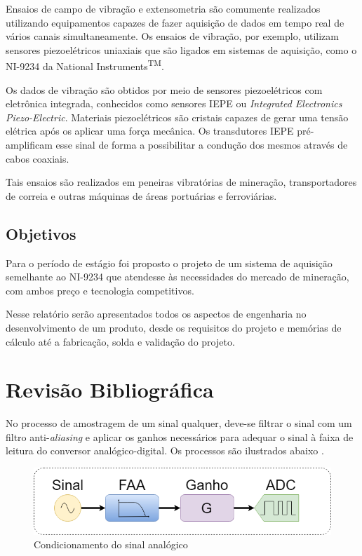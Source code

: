 \documentclass[
	12pt,				%
	openright,			%
	twoside,			%
	a4paper,			%
	english,			%
	french,				%
	spanish,			%
	brazil,				%
	]{abntex2}
\begin{document}
		Ensaios de campo de vibração e extensometria são comumente realizados
		utilizando equipamentos capazes de fazer aquisição de dados em tempo
		real de vários canais simultaneamente. Os ensaios de vibração, por
		exemplo, utilizam sensores piezoelétricos uniaxiais que são ligados em
		sistemas de aquisição, como o NI-9234 da National
		Instruments\textsuperscript{TM}.
		
		Os dados de vibração são obtidos por meio de sensores piezoelétricos com
		eletrônica integrada, conhecidos como sensores IEPE ou \textit{Integrated
		Electronics Piezo-Electric}. Materiais piezoelétricos são cristais capazes de
		gerar uma tensão elétrica após os aplicar uma força mecânica.
		Os transdutores IEPE pré-amplificam esse sinal de forma a possibilitar a
		condução dos mesmos através de cabos coaxiais.

		Tais ensaios são realizados em peneiras vibratórias de mineração,
		transportadores de correia e outras máquinas de áreas portuárias e ferroviárias.

	\section{Objetivos}
		Para o período de estágio foi proposto o projeto de um sistema de aquisição
		semelhante ao NI-9234 que atendesse às necessidades do mercado de mineração,
		com ambos preço e tecnologia competitivos.

		Nesse relatório serão apresentados todos os aspectos de engenharia no
		desenvolvimento de um produto, desde os requisitos do projeto e memórias de
		cálculo até a fabricação, solda e validação do projeto.



\chapter{Revisão Bibliográfica}
	No processo de amostragem de um sinal qualquer, deve-se filtrar o sinal com
	um filtro anti-\textit{aliasing} e aplicar os ganhos necessários para adequar
	o sinal à faixa de leitura do conversor analógico-digital. Os processos são
	ilustrados abaixo \cite{artElectronics}.

	\begin{figure}[H]
		\centering
		\includegraphics[width=\linewidth]{../Fotos/Diagramas/sinalFaaADC/sinalFaaADC.png}
		\caption{Condicionamento do sinal analógico}
		\label{fig:condicionamentoSinal}
	\end{figure}
\end{document}
